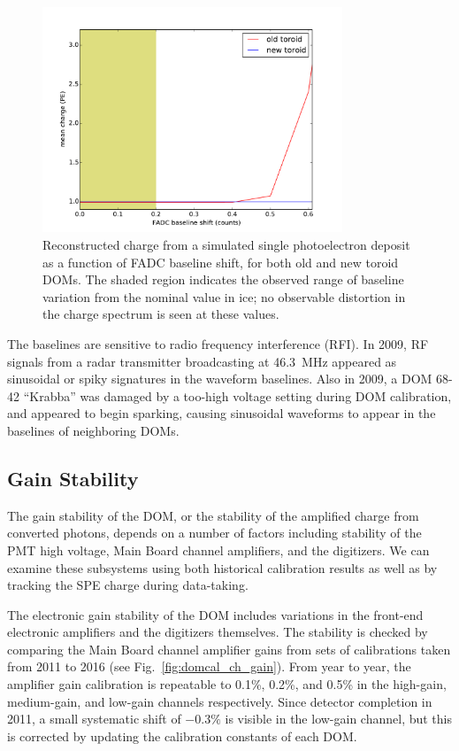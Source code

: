 \begin{figure}[!h]
 \centering
 \includegraphics[width=0.8\textwidth]{graphics/dom/reliability/charge_fadcshift.pdf}
 \caption{Reconstructed charge from a simulated single photoelectron
   deposit as a function of FADC baseline shift, for both old and new
   toroid DOMs. The shaded region indicates the observed range of
   baseline variation from the nominal value in ice; no observable
   distortion in the charge spectrum is seen at these values.}
 \label{fig:charge_fadcshift}
\end{figure}

The baselines are sensitive to radio frequency interference (RFI). In
2009, RF signals from a radar transmitter broadcasting at 46.3~MHz
appeared as sinusoidal or spiky signatures in the waveform
baselines. Also in 2009, a DOM 68-42 ``Krabba'' was damaged by a too-high
voltage setting during DOM calibration, and appeared to begin
sparking, causing sinusoidal waveforms to appear in the baselines of
neighboring DOMs.

\subsection{Gain Stability}

The gain stability of the DOM, or the stability of the amplified charge
from converted photons, depends on a number of factors including stability
of the PMT high voltage, Main Board channel amplifiers, and the digitizers.
We can examine these subsystems using both historical calibration results
as well as by tracking the SPE charge during data-taking.

The electronic gain stability of the DOM includes variations in the
front-end electronic amplifiers and the digitizers themselves.  The
stability is checked by comparing the Main Board channel amplifier gains
from sets of calibrations taken from 2011 to 2016 (see
Fig.~\ref{fig:domcal_ch_gain}).  From year to year, the amplifier gain
calibration is repeatable to 0.1\%, 0.2\%, and 0.5\% in the high-gain,
medium-gain, and low-gain channels respectively.  Since detector completion
in 2011, a small systematic shift of $-0.3\%$ is visible in the low-gain
channel, but this is corrected by updating the calibration constants of
each DOM.

